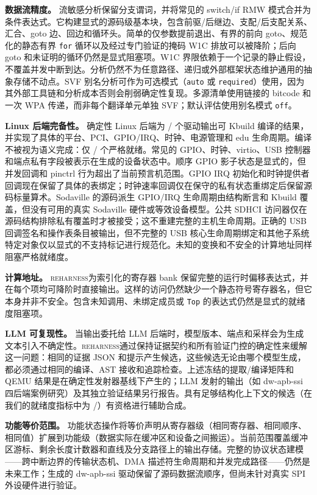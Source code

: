 \documentclass[sigplan, screen, review, anonymous]{acmart}
\newcommand{\reharness}{\textsc{reharness}}
\begin{document}
\textbf{数据流精度。} 流敏感分析保留分支谓词，并将常见的 switch/if RMW 模式合并为条件表达式。它构建显式的源码级基本块，包含前驱/后继边、支配/后支配关系、汇合、goto 边、回边和循环头。简单的仅参数提前退出、有界的前向 goto、规范化的静态有界 \texttt{for} 循环以及经过专门验证的掩码 W1C 排放可以被降阶；后向 goto 和未证明的循环仍然是显式阻塞项。W1C 界限依赖于一个记录的静止假设，不覆盖并发中断到达。分析仍然不为任意路径、递归或外部框架状态维护通用的抽象存储不动点。SVF 别名分析可作为可选模式（\texttt{auto} 或 \texttt{required}）使用，因为其外部工具链和分析成本否则会削弱确定性复现。多源清单使用链接的 bitcode 和一次 WPA 传递，而非每个翻译单元单独 SVF；默认评估使用别名模式 \texttt{off}。

\textbf{Linux 后端完备性。} 确定性 Linux 后端为 \LinuxCompileCount{}/\EvalDrivers{} 个驱动输出可 Kbuild 编译的结果，并实现了具体的平台、PCI、GPIO/IRQ、时钟、电源管理和 edu 生命周期。编译不被视为语义完成：仅 \LinuxReadyCount{}/\EvalDrivers{} 个严格就绪。常见的 GPIO、时钟、virtio、USB 控制器和端点私有字段被表示在生成的设备状态中。顺序 GPIO 影子状态是显式的，但并发回调和 pinctrl 行为超出了当前预言机范围。GPIO IRQ 初始化和时钟提供者回调现在保留了具体的表绑定；时钟速率回调仅在保守的私有状态重绑定后保留源码标量算术。Sodaville 的源码派生 GPIO/IRQ 生命周期由结构断言和 Kbuild 覆盖，但没有可用的真实 Sodaville 硬件或等效设备模型。公共 SDHCI 访问器仅在源码结构排除私有覆盖时才被接受；这不重建完整的主机生命周期。正确的 USB 回调签名和操作表条目被输出，但不完整的 USB 核心生命周期绑定和其他子系统特定对象仅以显式的不支持标记进行规范化。未知的变换和不安全的计算地址同样阻塞严格就绪度。

\textbf{计算地址。} \reharness 为索引化的寄存器 bank 保留完整的运行时偏移表达式，并在每个项均可降阶时直接输出。这样的访问仍然缺少一个静态符号寄存器名，但它本身并非不安全。包含未知调用、未绑定成员或 \texttt{Top} 的表达式仍然是显式的就绪度阻塞项。

\textbf{LLM 可复现性。} 当输出委托给 LLM 后端时，模型版本、端点和采样会为生成文本引入不确定性。\reharness 通过保持证据契约和所有验证门控的确定性来缓解这一问题：相同的证据 JSON 和提示产生候选，这些候选无论由哪个模型生成，都必须通过相同的编译、AST 接收和追踪检查。上述冻结的提取/编译矩阵和 QEMU 结果是在确定性发射器基线下产生的；LLM 发射的输出（如 dw-apb-ssi 四后端案例研究）及其独立验证结果另行报告。具有足够结构化上下文的候选（在我们的就绪度指标中为 \LLMReadyCount{}/\EvalDrivers{}）有资格进行辅助合成。

\textbf{功能等价范围。} 功能状态操作将等价声明从寄存器级（相同寄存器、相同顺序、相同值）扩展到功能级（数据实际在缓冲区和设备之间搬运）。当前范围覆盖缓冲区游标、剩余长度计数器和直线及分支路径上的输出存储。完整的协议状态建模——跨中断边界的传输状态机、DMA 描述符生命周期和并发完成路径——仍然是未来工作；生成的 dw-apb-ssi 驱动保留了源码数据流顺序，但尚未针对真实 SPI 外设硬件进行验证。
\end{document}
